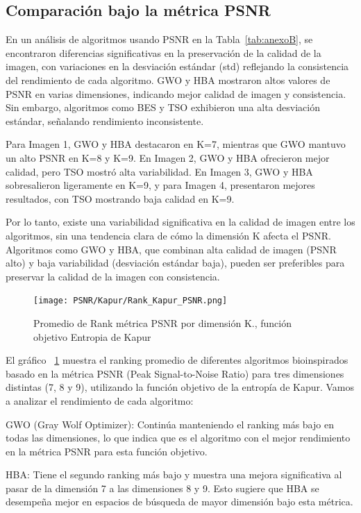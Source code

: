 \documentclass[conference]{IEEEtran}
\begin{document}
\subsection{Comparación bajo la métrica PSNR}
\noindent En un análisis de algoritmos usando PSNR en la Tabla~\ref{tab:anexoB}, se encontraron diferencias significativas en la preservación de la calidad de la imagen, con variaciones en la desviación estándar (std) reflejando la consistencia del rendimiento de cada algoritmo. GWO y HBA mostraron altos valores de PSNR en varias dimensiones, indicando mejor calidad de imagen y consistencia. Sin embargo, algoritmos como BES y TSO exhibieron una alta desviación estándar, señalando rendimiento inconsistente.

\noindent Para Imagen 1, GWO y HBA destacaron en K=7, mientras que GWO mantuvo un alto PSNR en K=8 y K=9. En Imagen 2, GWO y HBA ofrecieron mejor calidad, pero TSO mostró alta variabilidad. En Imagen 3, GWO y HBA sobresalieron ligeramente en K=9, y para Imagen 4, presentaron mejores resultados, con TSO mostrando baja calidad en K=9.

\noindent Por lo tanto, existe una variabilidad significativa en la calidad de imagen entre los algoritmos, sin una tendencia clara de cómo la dimensión K afecta el PSNR. Algoritmos como GWO y HBA, que combinan alta calidad de imagen (PSNR alto) y baja variabilidad (desviación estándar baja), pueden ser preferibles para preservar la calidad de la imagen con consistencia.


\begin{figure}[htbp]
	\centering
	\texttt{[image: PSNR/Kapur/Rank\_Kapur\_PSNR.png]}
	\caption{Promedio de Rank métrica PSNR por dimensión K., función objetivo Entropia de Kapur}
	\label{fig:PSNR_Kapur_Rank}
\end{figure}

\noindent El gráfico ~\ref{fig:PSNR_Kapur_Rank}  muestra el ranking promedio de diferentes algoritmos bioinspirados basado en la métrica PSNR (Peak Signal-to-Noise Ratio) para tres dimensiones distintas (7, 8 y 9), utilizando la función objetivo de la entropía de Kapur. Vamos a analizar el rendimiento de cada algoritmo:

\noindent GWO (Gray Wolf Optimizer): Continúa manteniendo el ranking más bajo en todas las dimensiones, lo que indica que es el algoritmo con el mejor rendimiento en la métrica PSNR para esta función objetivo.

\noindent HBA: Tiene el segundo ranking más bajo y muestra una mejora significativa al pasar de la dimensión 7 a las dimensiones 8 y 9. Esto sugiere que HBA se desempeña mejor en espacios de búsqueda de mayor dimensión bajo esta métrica.
\end{document}

